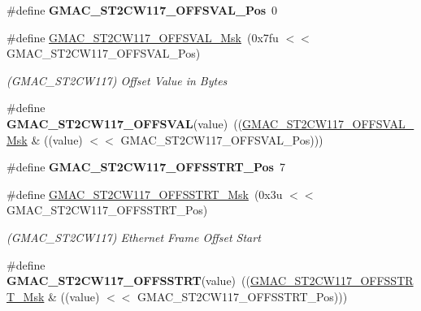 \begin{DoxyCompactItemize}
\item 
\mbox{\label{group__SAME70__GMAC_ga5ff7c112979c302370a6bbf492a7ebed}} 
\#define {\bfseries G\+M\+A\+C\+\_\+\+S\+T2\+C\+W117\+\_\+\+O\+F\+F\+S\+V\+A\+L\+\_\+\+Pos}~0
\item 
\mbox{\label{group__SAME70__GMAC_gab1a91e81a7a915110edd0cf0aeafb51c}} 
\#define \mbox{\hyperlink{group__SAME70__GMAC_gab1a91e81a7a915110edd0cf0aeafb51c}{G\+M\+A\+C\+\_\+\+S\+T2\+C\+W117\+\_\+\+O\+F\+F\+S\+V\+A\+L\+\_\+\+Msk}}~(0x7fu $<$$<$ G\+M\+A\+C\+\_\+\+S\+T2\+C\+W117\+\_\+\+O\+F\+F\+S\+V\+A\+L\+\_\+\+Pos)
\begin{DoxyCompactList}\small\item\em (G\+M\+A\+C\+\_\+\+S\+T2\+C\+W117) Offset Value in Bytes \end{DoxyCompactList}\item 
\mbox{\label{group__SAME70__GMAC_ga435aeb6edc4a56c1fd80ff04f0ef6e25}} 
\#define {\bfseries G\+M\+A\+C\+\_\+\+S\+T2\+C\+W117\+\_\+\+O\+F\+F\+S\+V\+AL}(value)~((\mbox{\hyperlink{group__SAMV71__GMAC_gab1a91e81a7a915110edd0cf0aeafb51c}{G\+M\+A\+C\+\_\+\+S\+T2\+C\+W117\+\_\+\+O\+F\+F\+S\+V\+A\+L\+\_\+\+Msk}} \& ((value) $<$$<$ G\+M\+A\+C\+\_\+\+S\+T2\+C\+W117\+\_\+\+O\+F\+F\+S\+V\+A\+L\+\_\+\+Pos)))
\item 
\mbox{\label{group__SAME70__GMAC_gace86b42d09355d09cf5b2c22f5cb1f0e}} 
\#define {\bfseries G\+M\+A\+C\+\_\+\+S\+T2\+C\+W117\+\_\+\+O\+F\+F\+S\+S\+T\+R\+T\+\_\+\+Pos}~7
\item 
\mbox{\label{group__SAME70__GMAC_ga3b1c72ac70774588fb43447f588bddf0}} 
\#define \mbox{\hyperlink{group__SAME70__GMAC_ga3b1c72ac70774588fb43447f588bddf0}{G\+M\+A\+C\+\_\+\+S\+T2\+C\+W117\+\_\+\+O\+F\+F\+S\+S\+T\+R\+T\+\_\+\+Msk}}~(0x3u $<$$<$ G\+M\+A\+C\+\_\+\+S\+T2\+C\+W117\+\_\+\+O\+F\+F\+S\+S\+T\+R\+T\+\_\+\+Pos)
\begin{DoxyCompactList}\small\item\em (G\+M\+A\+C\+\_\+\+S\+T2\+C\+W117) Ethernet Frame Offset Start \end{DoxyCompactList}\item 
\mbox{\label{group__SAME70__GMAC_ga1406dcb0c21c79f10dbb635a2c6d5687}} 
\#define {\bfseries G\+M\+A\+C\+\_\+\+S\+T2\+C\+W117\+\_\+\+O\+F\+F\+S\+S\+T\+RT}(value)~((\mbox{\hyperlink{group__SAMV71__GMAC_ga3b1c72ac70774588fb43447f588bddf0}{G\+M\+A\+C\+\_\+\+S\+T2\+C\+W117\+\_\+\+O\+F\+F\+S\+S\+T\+R\+T\+\_\+\+Msk}} \& ((value) $<$$<$ G\+M\+A\+C\+\_\+\+S\+T2\+C\+W117\+\_\+\+O\+F\+F\+S\+S\+T\+R\+T\+\_\+\+Pos)))

\end{DoxyCompactItemize}
